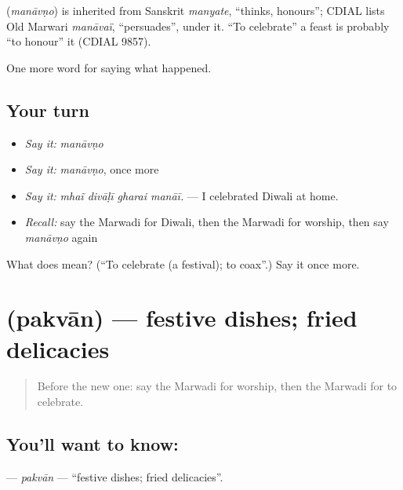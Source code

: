 \begin{cousinweb}
\textbf{} (\emph{manāvṇo}) is inherited from Sanskrit \emph{manyate}, \textquotedblleft{}thinks, honours\textquotedblright{}; CDIAL lists Old Marwari \emph{manāvaï}, \textquotedblleft{}persuades\textquotedblright{}, under it. \textquotedblleft{}To celebrate\textquotedblright{} a feast is probably \textquotedblleft{}to honour\textquotedblright{} it (CDIAL 9857).
\end{cousinweb}

\begin{grammarlens}[title={What you've built}]
One more word for saying what happened.
\end{grammarlens}

\subsection*{Your turn}
\begin{itemize}
\raggedright
  \item \emph{Say it:} \emph{manāvṇo}
  \item \emph{Say it:} \emph{manāvṇo}, once more
  \item \emph{Say it:} \emph{mhaĩ divāḷī gharai manāī.} — I celebrated Diwali at home.
  \item \emph{Recall:} say the Marwadi for Diwali, then the Marwadi for worship, then say \emph{manāvṇo} again
\end{itemize}

\begin{tcolorbox}[breakable,colback=teal!4,colframe=teal!35!black,title={Before you move on}]
What does  mean? (\textquotedblleft{}To celebrate (a festival); to coax\textquotedblright{}.) Say it once more.
\end{tcolorbox}
\section[\texorpdfstring{\mw{पकवान} (pakvān)}{पकवान (pakvān)}]{ (pakvān) — festive dishes; fried delicacies}

\label{lesson:MW-C250-pakvan}



\begin{quote}
Before the new one: say the Marwadi for worship, then the Marwadi for to celebrate.
\end{quote}

\subsection*{You'll want to know: }
\textbf{} — \emph{pakvān} — \textquotedblleft{}festive dishes; fried delicacies\textquotedblright{}.


